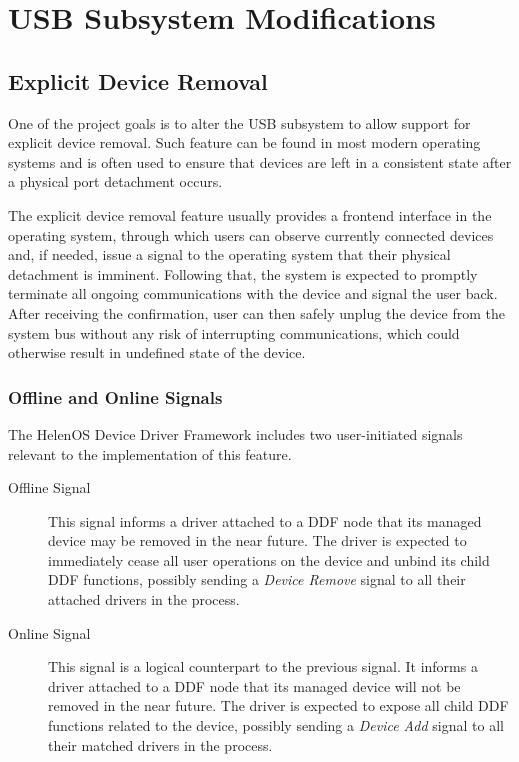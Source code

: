 \chapter{USB Subsystem Modifications}
\label{usb-refactoring}


\section{Explicit Device Removal}
One of the project goals is to alter the USB subsystem to allow support for explicit device removal. Such feature can be found in most modern operating systems and is often used to ensure that devices are left in a consistent state after a physical port detachment occurs.

The explicit device removal feature usually provides a frontend interface in the operating system, through which users can observe currently connected devices and, if needed, issue a signal to the operating system that their physical detachment is imminent. Following that, the system is expected to promptly terminate all ongoing communications with the device and signal the user back. After receiving the confirmation, user can then safely unplug the device from the system bus without any risk of interrupting communications, which could otherwise result in undefined state of the device.


\subsection{Offline and Online Signals}
The HelenOS Device Driver Framework includes two user-initiated signals relevant to the implementation of this feature.

\begin{description}
	\item[Offline Signal]
		This signal informs a driver attached to a DDF node that its managed device may be removed in the near future. The driver is expected to immediately cease all user operations on the device and unbind its child DDF functions, possibly sending a \textit{Device Remove} signal to all their attached drivers in the process.

	\item[Online Signal]
		This signal is a logical counterpart to the previous signal. It informs a driver attached to a DDF node that its managed device will not be removed in the near future. The driver is expected to expose all child DDF functions related to the device, possibly sending a \textit{Device Add} signal to all their matched drivers in the process.
\end{description}

